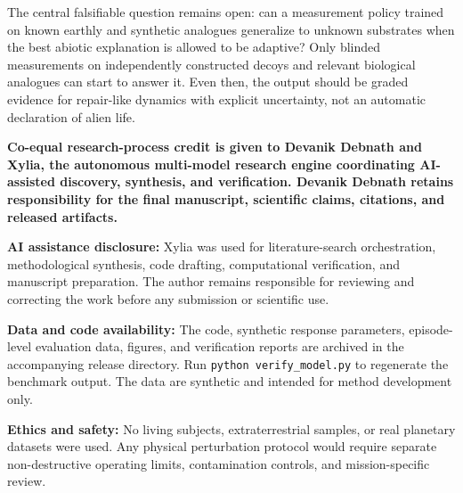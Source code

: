 \documentclass[11pt]{article}
\begin{document}
The central falsifiable question remains open: can a measurement policy trained on known earthly and synthetic analogues generalize to unknown substrates when the best abiotic explanation is allowed to be adaptive? Only blinded measurements on independently constructed decoys and relevant biological analogues can start to answer it. Even then, the output should be graded evidence for repair-like dynamics with explicit uncertainty, not an automatic declaration of alien life.

\textbf{Co-equal research-process credit is given to Devanik Debnath and Xylia, the autonomous multi-model research engine coordinating AI-assisted discovery, synthesis, and verification. Devanik Debnath retains responsibility for the final manuscript, scientific claims, citations, and released artifacts.}

\textbf{AI assistance disclosure:} Xylia was used for literature-search orchestration, methodological synthesis, code drafting, computational verification, and manuscript preparation. The author remains responsible for reviewing and correcting the work before any submission or scientific use.

\textbf{Data and code availability:} The code, synthetic response parameters, episode-level evaluation data, figures, and verification reports are archived in the accompanying release directory. Run \texttt{python verify\_model.py} to regenerate the benchmark output. The data are synthetic and intended for method development only.

\textbf{Ethics and safety:} No living subjects, extraterrestrial samples, or real planetary datasets were used. Any physical perturbation protocol would require separate non-destructive operating limits, contamination controls, and mission-specific review.

\printbibliography
\end{document}
